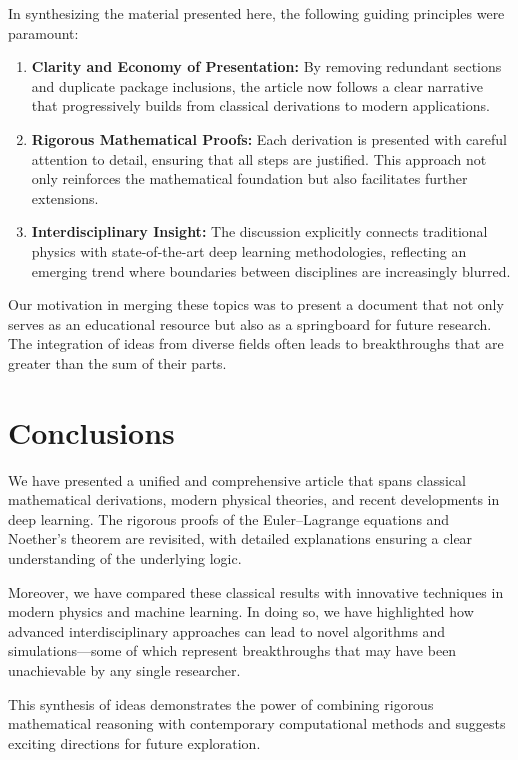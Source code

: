 \documentclass[11pt,a4paper]{article}
\begin{document}
In synthesizing the material presented here, the following guiding principles were paramount:
\begin{enumerate}[label=\arabic*.]
    \item \textbf{Clarity and Economy of Presentation:} By removing redundant sections and duplicate package inclusions, the article now follows a clear narrative that progressively builds from classical derivations to modern applications.
    \item \textbf{Rigorous Mathematical Proofs:} Each derivation is presented with careful attention to detail, ensuring that all steps are justified. This approach not only reinforces the mathematical foundation but also facilitates further extensions.
    \item \textbf{Interdisciplinary Insight:} The discussion explicitly connects traditional physics with state-of-the-art deep learning methodologies, reflecting an emerging trend where boundaries between disciplines are increasingly blurred.
\end{enumerate}

Our motivation in merging these topics was to present a document that not only serves as an educational resource but also as a springboard for future research. The integration of ideas from diverse fields often leads to breakthroughs that are greater than the sum of their parts.

\section{Conclusions}

We have presented a unified and comprehensive article that spans classical mathematical derivations, modern physical theories, and recent developments in deep learning. The rigorous proofs of the Euler--Lagrange equations and Noether’s theorem are revisited, with detailed explanations ensuring a clear understanding of the underlying logic.

Moreover, we have compared these classical results with innovative techniques in modern physics and machine learning. In doing so, we have highlighted how advanced interdisciplinary approaches can lead to novel algorithms and simulations—some of which represent breakthroughs that may have been unachievable by any single researcher.

This synthesis of ideas demonstrates the power of combining rigorous mathematical reasoning with contemporary computational methods and suggests exciting directions for future exploration.
\end{document}
